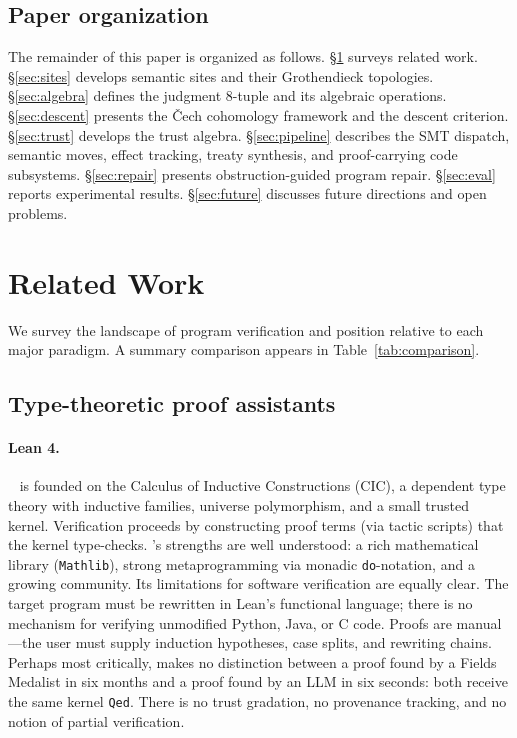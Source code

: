 \subsection{Paper organization}\label{sec:intro:organization}

The remainder of this paper is organized as follows.
\S\ref{sec:related} surveys related work.
\S\ref{sec:sites} develops semantic sites and their Grothendieck topologies.
\S\ref{sec:algebra} defines the judgment 8-tuple and its algebraic
operations.
\S\ref{sec:descent} presents the \v{C}ech cohomology framework and the
descent criterion.
\S\ref{sec:trust} develops the trust algebra.
\S\ref{sec:pipeline} describes the SMT dispatch, semantic moves, effect
tracking, treaty synthesis, and proof-carrying code subsystems.
\S\ref{sec:repair} presents obstruction-guided program repair.
\S\ref{sec:eval} reports experimental results.
\S\ref{sec:future} discusses future directions and open problems.

\section{Related Work}\label{sec:related}

We survey the landscape of program verification and position \JuGeo{}
relative to each major paradigm.  A summary comparison appears in
Table~\ref{tab:comparison}.

\subsection{Type-theoretic proof assistants}\label{sec:related:type-theory}

\paragraph{Lean 4.}
\LEAN{}~\cite{lean4} is founded on the Calculus of Inductive Constructions
(CIC), a dependent type theory with inductive families, universe
polymorphism, and a small trusted kernel.  Verification proceeds by
constructing proof terms (via tactic scripts) that the kernel type-checks.
\LEAN{}'s strengths are well understood: a rich mathematical library
(\texttt{Mathlib}), strong metaprogramming via monadic \texttt{do}-notation,
and a growing community.  Its limitations for software verification are
equally clear.  The target program must be rewritten in Lean's functional
language; there is no mechanism for verifying unmodified Python, Java, or
C code.  Proofs are manual---the user must supply induction hypotheses,
case splits, and rewriting chains.  Perhaps most critically, \LEAN{} makes
no distinction between a proof found by a Fields Medalist in six months and
a proof found by an LLM in six seconds: both receive the same kernel
\texttt{Qed}.  There is no trust gradation, no provenance tracking, and no
notion of partial verification.

